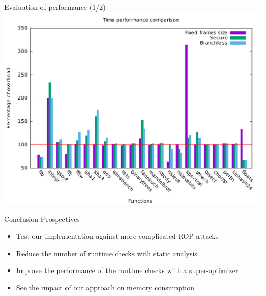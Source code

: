\documentclass{beamer}
\begin{document}
\begin{frame}[c]{Evaluation of performance (1/2)}
	\includegraphics[width=\textwidth]{images/time_percentage_graph.pdf}
\end{frame}

\begin{frame}[c]{Conclusion}
	Prospectives
	\begin{itemize}
		\item Test our implementation against more complicated ROP attacks
		\item Reduce the number of runtime checks with static analysis
		\item Improve the performance of the runtime checks with a super-optimizer
		\item See the impact of our approach on memory consumption
	\end{itemize}
\end{frame}

 
\end{document}
